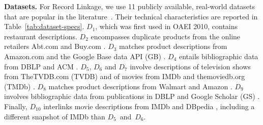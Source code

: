 

\textbf{Datasets.} For Record Linkage, we use 11 publicly available, real-world datasets that are popular in the literature~\cite{DBLP:journals/pvldb/Thirumuruganathan21,DBLP:journals/pvldb/KopckeTR10,DBLP:conf/sigmod/MudgalLRDPKDAR18}. Their technical characteristics are reported in Table~\ref{tab:dataset-specs}. $D_{1}$, which was first used in OAEI 2010,
contains restaurant descriptions. $D_{2}$ encompasses duplicate products from the online retailers Abt.com and Buy.com \cite{DBLP:journals/pvldb/KopckeTR10}. $D_{3}$ matches product descriptions from Amazon.com and the Google Base data API (GB) \cite{DBLP:journals/pvldb/KopckeTR10}. $D_{4}$ entails bibliographic data from DBLP and ACM \cite{DBLP:journals/pvldb/KopckeTR10}. $D_{5}$, $D_{6}$ and $D_{7}$ involve descriptions of television shows from TheTVDB.com (TVDB) and of movies from IMDb and themoviedb.org (TMDb) \cite{DBLP:conf/esws/ObraczkaSR21}. $D_{8}$ matches product descriptions from Walmart and Amazon \cite{DBLP:conf/sigmod/MudgalLRDPKDAR18}. $D_{9}$ involves bibliographic data from publications in DBLP and Google Scholar (GS) \cite{DBLP:journals/pvldb/KopckeTR10}. Finally, 
$D_{10}$ interlinks movie descriptions from IMDb and DBpedia \cite{DBLP:journals/vldb/PapadakisETHC23}, including a different snapshot of IMDb than $D_5$~and~$D_6$. 


